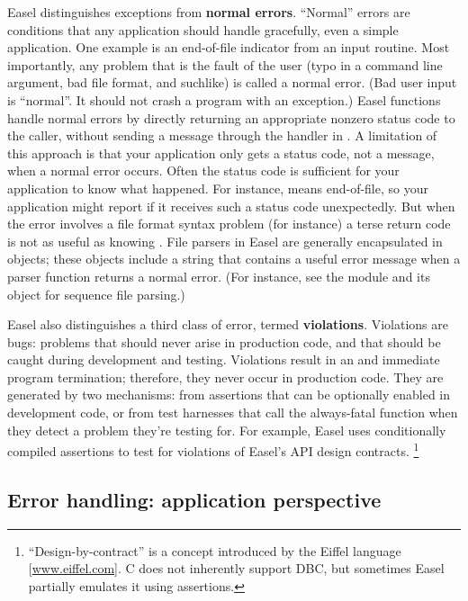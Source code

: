 Easel distinguishes exceptions from \textbf{normal errors}. ``Normal''
errors are conditions that any application should handle gracefully,
even a simple application. One example is an end-of-file indicator
from an input routine. Most importantly, any problem that is the fault
of the user (typo in a command line argument, bad file format, and
suchlike) is called a normal error. (Bad user input is ``normal''. It
should not crash a program with an exception.) Easel functions handle
normal errors by directly returning an appropriate nonzero status code
to the caller, without sending a message through the handler in
. A limitation of this approach is that your
application only gets a status code, not a message, when a normal
error occurs. Often the status code is sufficient for your application
to know what happened. For instance,  means end-of-file,
so your application might report  if it
receives such a status code unexpectedly. But when the error involves
a file format syntax problem (for instance) a terse 
return code is not as useful as knowing . File parsers in
Easel are generally encapsulated in objects; these objects include a
 string that contains a useful error message when a
parser function returns a normal error. (For instance, see the
 module and its  object for sequence
file parsing.)

Easel also distinguishes a third class of error, termed
\textbf{violations}. Violations are bugs: problems that should never
arise in production code, and that should be caught during development
and testing. Violations result in an  and immediate
program termination; therefore, they never occur in production
code. They are generated by two mechanisms: from assertions that can
be optionally enabled in development code, or from test harnesses that
call the always-fatal  function when they detect a
problem they're testing for. For example, Easel uses conditionally
compiled assertions to test for violations of Easel's API design
contracts. \footnote{``Design-by-contract'' is a concept introduced by
the Eiffel language [\url{www.eiffel.com}]. C does not inherently
support DBC, but sometimes Easel partially emulates it using
assertions.}

\subsection{Error handling: application perspective}

